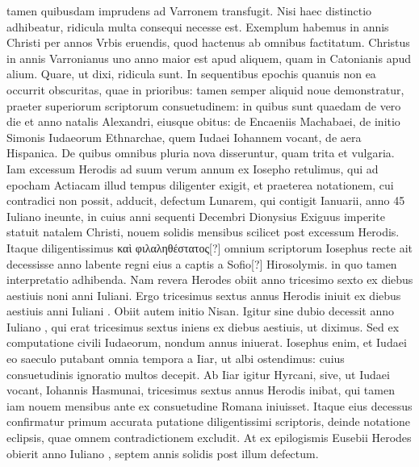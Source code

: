 tamen quibusdam imprudens ad Varronem transfugit.
Nisi
haec distinctio adhibeatur, ridicula multa consequi necesse est.
Exemplum habemus in annis Christi per annos Vrbis eruendis,
quod hactenus ab omnibus factitatum.
Christus in annis Varronianus
uno anno maior est apud aliquem, quam in Catonianis apud alium.
Quare, ut dixi, ridicula sunt.
In sequentibus epochis quanuis
non ea occurrit obscuritas, quae in prioribus: tamen semper aliquid
noue demonstratur, praeter superiorum scriptorum consuetudinem:
in quibus sunt quaedam de vero die et anno natalis Alexandri, eiusque
obitus: de Encaeniis Machabaei, de initio Simonis Iudaeorum
Ethnarchae, quem Iudaei Iohannem vocant, de aera Hispanica.
De quibus omnibus pluria nova disseruntur, quam trita et vulgaria.
Iam
excessum Herodis ad suum verum annum ex Iosepho retulimus,
qui ad epocham Actiacam illud tempus diligenter exigit, et praeterea
notationem, cui contradici non possit, adducit, defectum Lunarem,
qui contigit  Ianuarii, anno 45 Iuliano ineunte, in cuius
anni sequenti Decembri Dionysius Exiguus imperite statuit natalem
Christi, nouem solidis mensibus scilicet post excessum Herodis.
Itaque diligentissimus \textgreek{καὶ φιλαληθέστατος[?]}
 omnium scriptorum Iosephus
recte ait decessisse  anno labente regni eius a captis a Sofio[?]
Hirosolymis. in quo tamen interpretatio adhibenda.
Nam revera Herodes
obiit anno tricesimo sexto ex diebus aestiuis noni anni Iuliani.
Ergo tricesimus sextus annus Herodis iniuit ex diebus aestiuis anni
Iuliani .
Obiit autem initio Nisan.
Igitur sine dubio decessit
anno Iuliano , qui erat tricesimus sextus iniens ex diebus aestiuis,
ut diximus.
Sed ex computatione civili Iudaeorum, nondum
 annus iniuerat.
Iosephus enim, et Iudaei eo saeculo putabant
omnia tempora a  Iiar, ut albi ostendimus: cuius consuetudinis
ignoratio multos decepit.
Ab Iiar igitur Hyrcani, sive, ut Iudaei
vocant, Iohannis Hasmunai, tricesimus sextus annus Herodis inibat,
qui tamen iam nouem mensibus ante ex consuetudine Romana iniuisset.
%
Itaque eius decessus confirmatur primum accurata putatione
diligentissimi scriptoris, deinde notatione eclipsis, quae omnem contradictionem
excludit.
At ex epilogismis Eusebii Herodes obierit
anno Iuliano , septem annis solidis post illum defectum.
